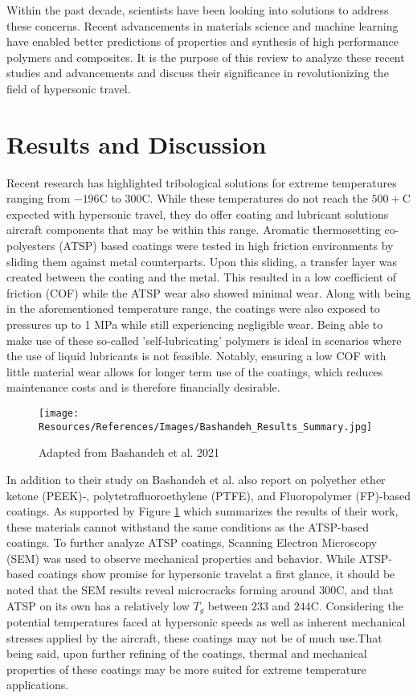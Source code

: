 \documentclass[12pt, twocolumn]{article}
\begin{document}
\indent Within the past decade, scientists have been looking into solutions to address these concerns. Recent advancements in materials science and machine learning have enabled better predictions of properties and synthesis of high performance polymers and composites. It is the purpose of this review to analyze these recent studies and advancements and discuss their significance in revolutionizing the field of hypersonic travel.
	
\section{Results and Discussion}

\indent Recent research has highlighted tribological solutions for extreme temperatures ranging from $-196$\degree C to $300$\degree C. While these temperatures do not reach the $500+$\degree C expected with hypersonic travel, they do offer coating and lubricant solutions aircraft components that may be within this range. Aromatic thermosetting co-polyesters (ATSP) based coatings were tested in high friction environments by sliding them against metal counterparts. Upon this sliding, a transfer layer was created between the coating and the metal. This resulted in a low coefficient of friction (COF) while the ATSP wear also showed minimal wear. Along with being in the aforementioned temperature range, the coatings were also exposed to pressures up to 1 MPa while still experiencing negligible wear. \citep{Bashandeh2021} Being able to make use of these so-called 'self-lubricating' polymers is ideal in scenarios where the use of liquid lubricants is not feasible. Notably, ensuring a low COF with little material wear allows for longer term use of the coatings, which reduces maintenance costs and is therefore financially desirable.

\begin{figure}[h]
    \centering
    \texttt{[image: Resources/References/Images/Bashandeh\_Results\_Summary.jpg]}
    \caption{\scriptsize{Adapted from Bashandeh et al. 2021 \citep{Bashandeh2021}}}
    \label{fig:Bashandeh-Summary}
\end{figure}

\indent In addition to their study on Bashandeh et al. also report on polyether ether ketone (PEEK)-, polytetrafluoroethylene (PTFE), and Fluoropolymer (FP)-based coatings. As supported by Figure \ref{fig:Bashandeh-Summary} which summarizes the results of their work, these materials cannot withstand the same conditions as the ATSP-based coatings. To further analyze ATSP coatings, Scanning Electron Microscopy (SEM) was used to observe mechanical properties and behavior. While ATSP-based coatings show promise for hypersonic travelat a first glance, it should be noted that the SEM results reveal microcracks forming around 300\degree C, and that ATSP on its own has a relatively low $T_g$ between $233$ and $244$\degree C. Considering the potential temperatures faced at hypersonic speeds as well as inherent mechanical stresses applied by the aircraft, these coatings may not be of much use.That being said, upon further refining of the coatings, thermal and mechanical properties of these coatings may be more suited for extreme temperature applications. 
\end{document}
